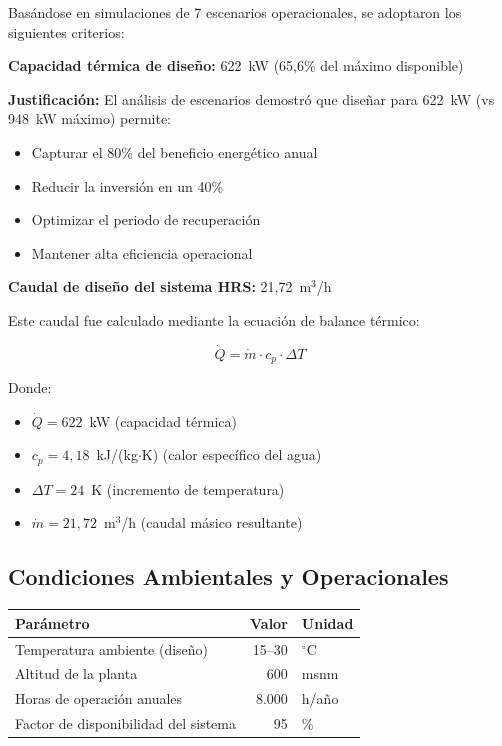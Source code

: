 \documentclass[12pt,a4paper]{article}
\begin{document}
Basándose en simulaciones de 7 escenarios operacionales, se adoptaron los siguientes criterios:

\textbf{Capacidad térmica de diseño:} 622~kW (65,6\% del máximo disponible)

\textbf{Justificación:} El análisis de escenarios demostró que diseñar para 622~kW (vs 948~kW máximo) permite:

\begin{itemize}
    \item Capturar el 80\% del beneficio energético anual
    \item Reducir la inversión en un 40\%
    \item Optimizar el periodo de recuperación
    \item Mantener alta eficiencia operacional
\end{itemize}

\textbf{Caudal de diseño del sistema HRS:} 21,72~m$^3$/h

Este caudal fue calculado mediante la ecuación de balance térmico:

\begin{equation}
\dot{Q} = \dot{m} \cdot c_p \cdot \Delta T
\end{equation}

Donde:
\begin{itemize}
    \item $\dot{Q} = 622$~kW (capacidad térmica)
    \item $c_p = 4{,}18$~kJ/(kg$\cdot$K) (calor específico del agua)
    \item $\Delta T = 24$~K (incremento de temperatura)
    \item $\dot{m} = 21{,}72$~m$^3$/h (caudal másico resultante)
\end{itemize}

\subsection{Condiciones Ambientales y Operacionales}

\begin{table}[h]
\centering
\begin{tabular}{lrl}
\toprule
\textbf{Parámetro} & \textbf{Valor} & \textbf{Unidad} \\
\midrule
Temperatura ambiente (diseño) & 15--30 & $^\circ$C \\
Altitud de la planta & 600 & msnm \\
Horas de operación anuales & 8.000 & h/año \\
Factor de disponibilidad del sistema & 95 & \% \\
\bottomrule
\end{tabular}
\end{table}
\end{document}
